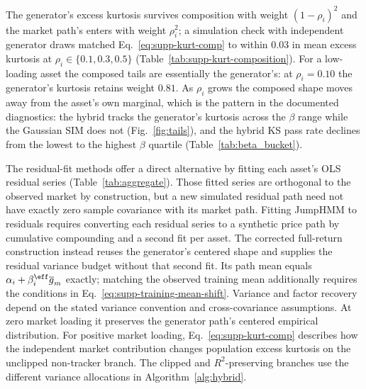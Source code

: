 The generator's excess kurtosis survives composition with weight
$(1 - \rho_i)^2$ and the market path's enters with weight $\rho_i^2$;
a simulation check with independent generator draws matched
Eq.~\eqref{eq:supp-kurt-comp} to within $0.03$ in mean excess
kurtosis at $\rho_i \in \{0.1, 0.3, 0.5\}$
(Table~\ref{tab:supp-kurt-composition}). For a low-loading asset
the composed tails are essentially the generator's: at
$\rho_i = 0.10$ the generator's kurtosis retains weight $0.81$. As
$\rho_i$ grows the composed shape moves away from the asset's own
marginal, which is the pattern in the documented diagnostics: the
hybrid tracks the generator's kurtosis across the $\beta$ range while
the Gaussian SIM does not (Fig.~\ref{fig:tails}), and the hybrid KS
pass rate declines from the lowest to the highest $\beta$ quartile
(Table~\ref{tab:beta_bucket}).

The residual-fit methods offer a direct alternative by fitting each
asset's OLS residual series (Table~\ref{tab:aggregate}). Those fitted
series are orthogonal to the observed market by construction, but a
new simulated residual path need not have exactly zero sample
covariance with its market path. Fitting JumpHMM to residuals requires
converting each residual series to a synthetic price path by
cumulative compounding and a second fit per asset. The corrected
full-return construction instead reuses the generator's centered
shape and supplies the residual variance budget without that second
fit. Its path mean equals
$\alpha_i+\beta_i^{\eff}\overline{g}_m$ exactly; matching the observed
training mean additionally requires the conditions in
Eq.~\eqref{eq:supp-training-mean-shift}. Variance and factor recovery
depend on the stated variance convention and cross-covariance
assumptions. At zero market loading it preserves the
generator path's centered empirical distribution. For positive market
loading, Eq.~\eqref{eq:supp-kurt-comp} describes how the independent
market contribution changes population excess kurtosis on the
unclipped non-tracker branch. The clipped and $R^2$-preserving branches
use the different variance allocations in Algorithm~\ref{alg:hybrid}.

\begin{table}[H]
\centering
\caption{\textbf{Simulation check of the kurtosis composition rule.}
    For each variance share $\rho_i$, $200$ pairs of independent
    in-sample-length generator paths were standardized and combined
    as $\sqrt{\rho_i}\, x + \sqrt{1 - \rho_i}\, y$. The predicted
    column evaluates Eq.~\eqref{eq:supp-kurt-comp} with each pair's
    sample excess kurtosis; the simulated column is the sample excess
    kurtosis of the combined series. Both are averaged over the $200$
    pairs.}
\label{tab:supp-kurt-composition}
\small

\end{table}



